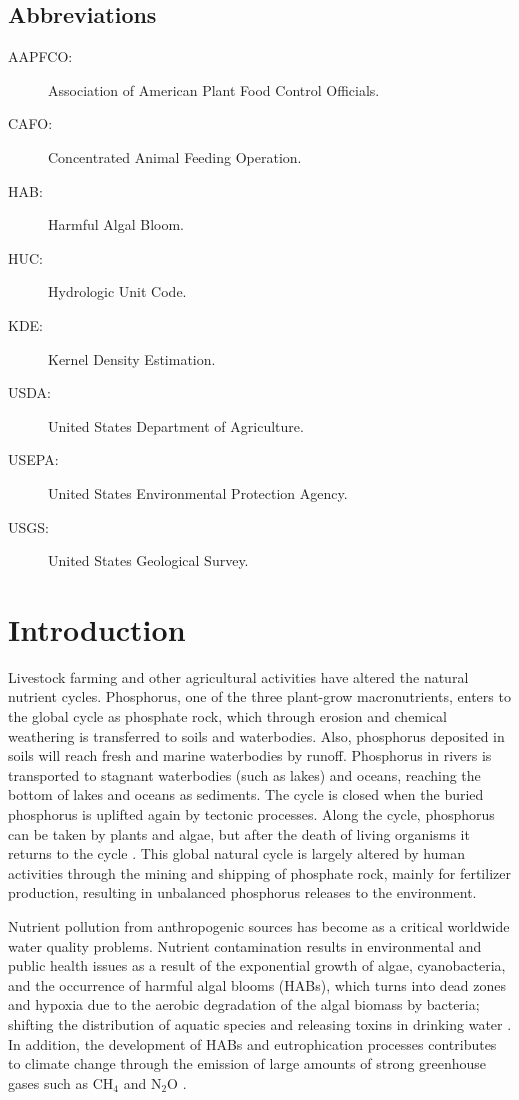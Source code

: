\documentclass[10pt,a4paper]{article}
\begin{document}
\subsection*{Abbreviations}
\begin{description}
	\item [\normalfont AAPFCO:] Association of American Plant Food Control Officials.
	\item [\normalfont CAFO:] Concentrated Animal Feeding Operation.
	\item [\normalfont HAB:] Harmful Algal Bloom.
	\item [\normalfont HUC:] Hydrologic Unit Code.
	\item [\normalfont KDE:] Kernel Density Estimation.
	\item [\normalfont USDA:] United States Department of Agriculture.
	\item [\normalfont USEPA:] United States Environmental Protection Agency.
	\item [\normalfont USGS:] United States Geological Survey.
\end{description}

\section{Introduction}
Livestock farming and other agricultural activities have altered the natural nutrient cycles. Phosphorus, one of the three plant-grow macronutrients, enters to the global cycle as phosphate rock, which through erosion and chemical weathering is transferred to soils and waterbodies. Also, phosphorus deposited in soils will reach fresh and marine waterbodies by runoff. Phosphorus in rivers is transported to stagnant waterbodies (such as lakes) and oceans, reaching the bottom of lakes and oceans as sediments. The cycle is closed when the buried phosphorus is uplifted again by tectonic processes. Along the cycle, phosphorus can be taken by plants and algae, but after the death of living organisms it returns to the cycle . This global natural cycle is largely altered by human activities through the mining and shipping of phosphate rock, mainly for fertilizer production, resulting in unbalanced phosphorus releases to the environment.

Nutrient pollution from anthropogenic sources has become as a critical worldwide water quality problems. Nutrient contamination results in environmental and public health issues as a result of the exponential growth of algae, cyanobacteria, and the occurrence of harmful algal blooms (HABs), which turns into dead zones and hypoxia due to the aerobic degradation of the algal biomass by bacteria; shifting the distribution of aquatic species and releasing toxins in drinking water . In addition, the development of HABs and eutrophication processes contributes to climate change through the emission of large amounts of strong greenhouse gases such as $\text{CH}_{4}$ and $\text{N}_{2}\text{O}$ .
\end{document}
